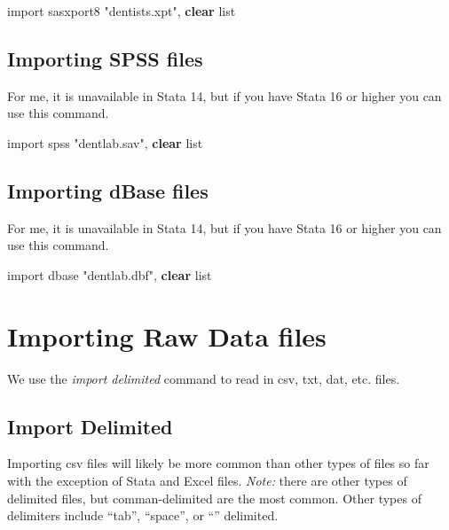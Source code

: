 \documentclass[
]{book}
\newenvironment{Shaded}{\begin{snugshade}}{\end{snugshade}}
\newcommand{\KeywordTok}[1]{\textcolor[rgb]{0.13,0.29,0.53}{\textbf{#1}}}
\newcommand{\NormalTok}[1]{#1}
\newcommand{\OtherTok}[1]{\textcolor[rgb]{0.56,0.35,0.01}{#1}}
\newcommand{\StringTok}[1]{\textcolor[rgb]{0.31,0.60,0.02}{#1}}
\begin{document}
\begin{Shaded}
\begin{Highlighting}[]
\NormalTok{import sasxport8 }\StringTok{"dentists.xpt"}\NormalTok{, }\KeywordTok{clear}
\OtherTok{list}
\end{Highlighting}
\end{Shaded}

\subsection{Importing SPSS files}\label{importing-spss-files}

For me, it is unavailable in Stata 14, but if you have Stata 16 or higher
you can use this command.

\begin{Shaded}
\begin{Highlighting}[]
\NormalTok{import spss }\StringTok{"dentlab.sav"}\NormalTok{, }\KeywordTok{clear}
\OtherTok{list}
\end{Highlighting}
\end{Shaded}

\subsection{Importing dBase files}\label{importing-dbase-files}

For me, it is unavailable in Stata 14, but if you have Stata 16 or higher you can use this command.

\begin{Shaded}
\begin{Highlighting}[]
\NormalTok{import dbase }\StringTok{"dentlab.dbf"}\NormalTok{, }\KeywordTok{clear}
\OtherTok{list}
\end{Highlighting}
\end{Shaded}

\section{Importing Raw Data files}\label{importing-raw-data-files}

We use the \emph{import delimited} command to read in csv, txt, dat, etc. files.

\subsection{Import Delimited}\label{import-delimited}

Importing csv files will likely be more common than other types of files so far with the exception of Stata and Excel files. \emph{Note:} there are other types of delimited files, but comman-delimited are the most common. Other types of delimiters include ``tab'', ``space'', or ``\textbar{}'' delimited.
\end{document}
